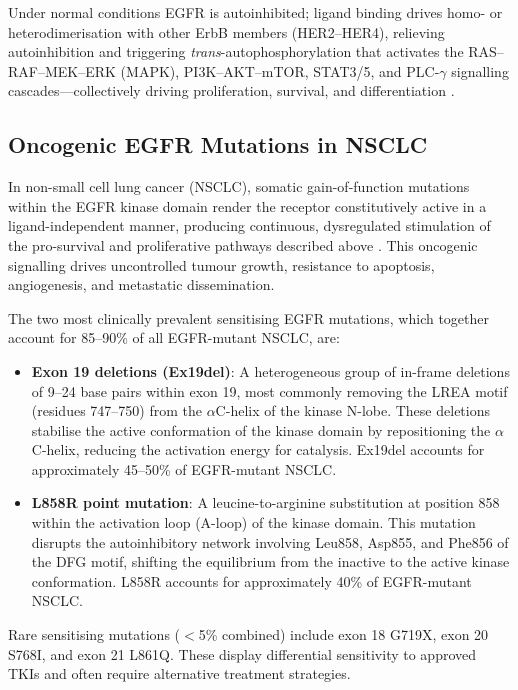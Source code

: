 Under normal conditions EGFR is autoinhibited; ligand binding drives homo- or
heterodimerisation with other ErbB members (HER2--HER4), relieving autoinhibition and
triggering \textit{trans}-autophosphorylation that activates the RAS--RAF--MEK--ERK
(MAPK), PI3K--AKT--mTOR, STAT3/5, and PLC-$\gamma$ signalling cascades---collectively
driving proliferation, survival, and differentiation \parencite{siegel2023cancer}.

\subsection{Oncogenic EGFR Mutations in NSCLC}

In non-small cell lung cancer (NSCLC), somatic gain-of-function mutations within
the EGFR kinase domain render the receptor constitutively active in a
ligand-independent manner, producing continuous, dysregulated stimulation of the
pro-survival and proliferative pathways described above \parencite{rotow2023egfr}.
This oncogenic signalling drives uncontrolled tumour growth, resistance to
apoptosis, angiogenesis, and metastatic dissemination.

The two most clinically prevalent sensitising EGFR mutations, which together
account for 85--90\% of all EGFR-mutant NSCLC, are:

\begin{itemize}
    \item \textbf{Exon 19 deletions (Ex19del)}: A heterogeneous group of in-frame
    deletions of 9--24 base pairs within exon 19, most commonly removing the
    LREA motif (residues 747--750) from the $\alpha$C-helix of the kinase N-lobe.
    These deletions stabilise the active conformation of the kinase domain by
    repositioning the $\alpha$C-helix, reducing the activation energy for catalysis.
    Ex19del accounts for approximately 45--50\% of EGFR-mutant NSCLC.
    \item \textbf{L858R point mutation}: A leucine-to-arginine substitution at
    position 858 within the activation loop (A-loop) of the kinase domain.
    This mutation disrupts the autoinhibitory network involving Leu858, Asp855,
    and Phe856 of the DFG motif, shifting the equilibrium from the inactive to
    the active kinase conformation. L858R accounts for approximately 40\% of
    EGFR-mutant NSCLC.
\end{itemize}

Rare sensitising mutations ($<$5\% combined) include exon 18 G719X, exon 20
S768I, and exon 21 L861Q. These display differential sensitivity to approved
TKIs and often require alternative treatment strategies.

